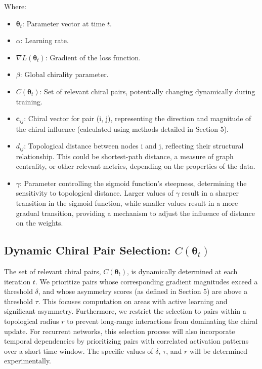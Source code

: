 \documentclass[12pt, a4paper]{article}
\begin{document}
Where:

\begin{itemize}
    \item \(\boldsymbol{\theta}_t\): Parameter vector at time \(t\).
    \item \(\alpha\): Learning rate.
    \item \(\nabla L(\boldsymbol{\theta}_t)\): Gradient of the loss function.
    \item \(\beta\): Global chirality parameter.
    \item \(C(\boldsymbol{\theta}_t)\): Set of relevant chiral pairs, potentially changing dynamically during training.
    \item \(\mathbf{c}_{ij}\): Chiral vector for pair (i, j), representing the direction and magnitude of the chiral influence (calculated using methods detailed in Section 5).
    \item \(d_{ij}\): Topological distance between nodes i and j, reflecting their structural relationship. This could be shortest-path distance, a measure of graph centrality, or other relevant metrics, depending on the properties of the data.
    \item \(\gamma\): Parameter controlling the sigmoid function’s steepness, determining the sensitivity to topological distance. Larger values of \(\gamma\) result in a sharper transition in the sigmoid function, while smaller values result in a more gradual transition, providing a mechanism to adjust the influence of distance on the weights.
\end{itemize}

\subsection{Dynamic Chiral Pair Selection: \(C(\boldsymbol{\theta}_t)\)}

The set of relevant chiral pairs, \(C(\boldsymbol{\theta}_t)\), is dynamically determined at each iteration $t$.  We prioritize pairs whose corresponding gradient magnitudes exceed a threshold $\delta$, and whose asymmetry scores (as defined in Section 5) are above a threshold $\tau$. This focuses computation on areas with active learning and significant asymmetry.  Furthermore, we restrict the selection to pairs within a topological radius $r$ to prevent long-range interactions from dominating the chiral update.  For recurrent networks, this selection process will also incorporate temporal dependencies by prioritizing pairs with correlated activation patterns over a short time window. The specific values of  $\delta$, $\tau$, and $r$  will be determined experimentally.
\end{document}
